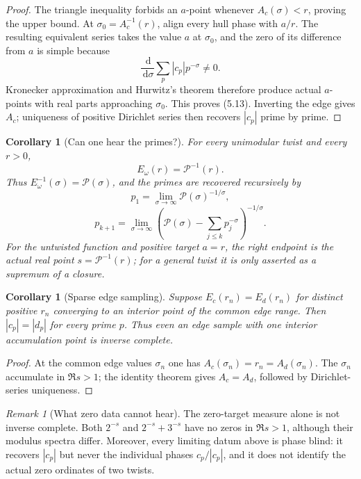 \documentclass[11pt]{article}
\newtheorem{corollary}[theorem]{Corollary}
\theoremstyle{definition}
\theoremstyle{remark}
\newtheorem{remark}[theorem]{Remark}
\newcommand{\cP}{\mathcal P}
\newcommand{\dd}{\,\mathrm d}
\begin{document}
\begin{proof}
The triangle inequality forbids an $a$-point whenever
$A_c(\sigma)<r$, proving the upper bound.  At
$\sigma_0=A_c^{-1}(r)$, align every hull phase with $a/r$.  The resulting equivalent
series takes the value $a$ at $\sigma_0$, and the zero of its difference from $a$ is
simple because
\[
 \frac{\dd}{\dd\sigma}
 \sum_p|c_p|p^{-\sigma}\ne0.
\]
Kronecker approximation and Hurwitz's theorem therefore produce actual $a$-points with
real parts approaching $\sigma_0$.  This proves (5.13).  Inverting the edge gives
$A_c$; uniqueness of positive Dirichlet series then recovers $|c_p|$ prime by prime.
\end{proof}

\begin{corollary}[Can one hear the primes?]
\label{cor:hear-primes}
For every unimodular twist and every $r>0$,
\[
 \boxed{E_\omega(r)=\cP^{-1}(r).}
\tag{5.15}
\]
Thus $E_\omega^{-1}(\sigma)=\cP(\sigma)$, and the primes are recovered recursively by
\[
 p_1=\lim_{\sigma\to\infty}\cP(\sigma)^{-1/\sigma},
\tag{5.16}
\]
\[
 p_{k+1}=\lim_{\sigma\to\infty}
 \left(\cP(\sigma)-\sum_{j\le k}p_j^{-\sigma}\right)^{-1/\sigma}.
\tag{5.17}
\]
For the untwisted function and positive target $a=r$, the right endpoint is the actual
real point $s=\cP^{-1}(r)$; for a general twist it is only asserted as a supremum of a
closure.
\end{corollary}

\begin{corollary}[Sparse edge sampling]
\label{cor:sparse-edge}
Suppose $E_c(r_n)=E_d(r_n)$ for distinct positive $r_n$ converging to an interior point
of the common edge range.  Then $|c_p|=|d_p|$ for every prime $p$.  Thus even an edge
sample with one interior accumulation point is inverse complete.
\end{corollary}

\begin{proof}
At the common edge values $\sigma_n$ one has
$A_c(\sigma_n)=r_n=A_d(\sigma_n)$.  The $\sigma_n$ accumulate in $\Re s>1$; the
identity theorem gives $A_c=A_d$, followed by Dirichlet-series uniqueness.
\end{proof}

\begin{remark}[What zero data cannot hear]
\label{rem:zero-not-complete}
The zero-target measure alone is not inverse complete.  Both $2^{-s}$ and
$2^{-s}+3^{-s}$ have no zeros in $\Re s>1$, although their modulus spectra differ.
Moreover, every limiting datum above is phase blind: it recovers $|c_p|$ but never the
individual phases $c_p/|c_p|$, and it does not identify the actual zero ordinates of
two twists.
\end{remark}
\end{document}

